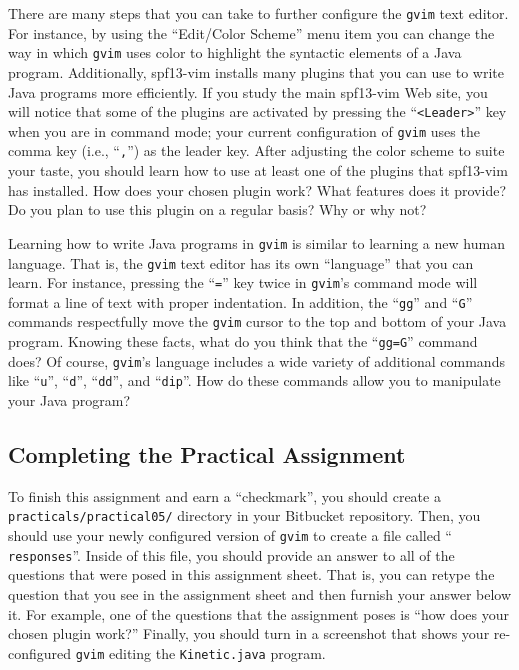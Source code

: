 There are many steps that you can take to further configure the {\tt gvim} text editor.  For instance, by using the
``Edit/Color Scheme'' menu item you can change the way in which {\tt gvim} uses color to highlight the syntactic
elements of a Java program. Additionally, spf13-vim installs many plugins that you can use to write Java programs more
efficiently.  If you study the main spf13-vim Web site, you will notice that some of the plugins are activated by
pressing the ``{\tt <Leader>}'' key when you are in command mode; your current configuration of {\tt gvim} uses the
comma key (i.e., ``{\tt ,}'') as the leader key. After adjusting the color scheme to suite your taste, you should learn
how to use at least one of the plugins that spf13-vim has installed.  How does your chosen plugin work?  What features
does it provide? Do you plan to use this plugin on a regular basis? Why or why not?

Learning how to write Java programs in {\tt gvim} is similar to learning a new human language.  That is, the {\tt gvim}
text editor has its own ``language'' that you can learn.  For instance, pressing the ``{\tt =}'' key twice in {\tt gvim}'s
command mode will format a line of text with proper indentation.  In addition, the ``{\tt gg}'' and ``{\tt G}'' commands
respectfully move the {\tt gvim} cursor to the top and bottom of your Java program.  Knowing these facts, what do you
think that the ``{\tt gg=G}'' command does? Of course, {\tt gvim}'s language includes a wide variety of additional
commands like ``{\tt u}'', ``{\tt d}'', ``{\tt dd}'', and ``{\tt dip}''.  How do these commands allow you to manipulate
your Java program?

\vspace*{-.15in}
\subsection*{Completing the Practical Assignment}
\vspace*{-.1in}

To finish this assignment and earn a ``checkmark'', you should create a {\tt practicals/practical05/} directory in your
Bitbucket repository. Then, you should use your newly configured version of {\tt gvim} to create a file called ``{\tt
responses}''. Inside of this file, you should provide an answer to all of the questions that were posed in this
assignment sheet. That is, you can retype the question that you see in the assignment sheet and then furnish your answer
below it. For example, one of the questions that the assignment poses is ``how does your chosen plugin work?'' Finally,
you should turn in a screenshot that shows your re-configured {\tt gvim} editing the {\tt Kinetic.java} program.

